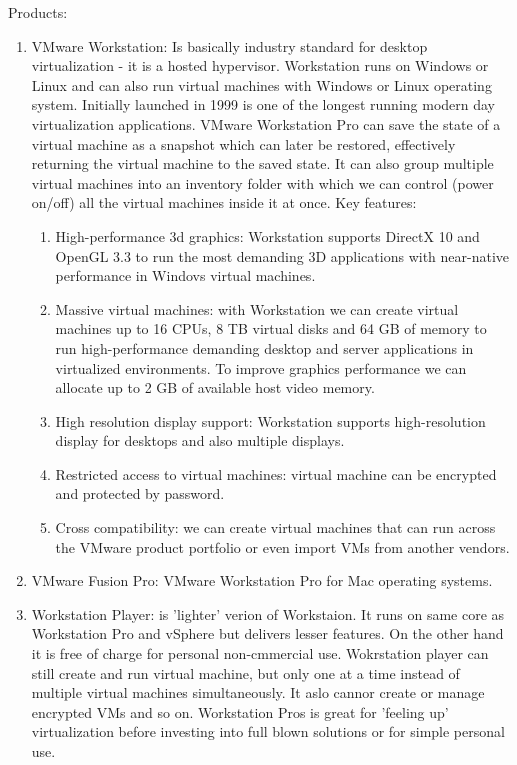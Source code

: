 \begin{itemize}
Products:
\begin{enumerate}
\item VMware Workstation: Is basically industry standard for desktop virtualization - it is a hosted hypervisor. Workstation runs on Windows or Linux and can also run virtual machines with Windows or Linux operating system. Initially launched in 1999 is one of the longest running modern day virtualization applications. VMware Workstation Pro can save the state of a virtual machine as a snapshot which can later be restored, effectively returning the virtual machine to the saved state. It can also group multiple virtual machines into an inventory folder with which we can control (power on/off) all the virtual machines inside it at once.
Key features:
\begin{enumerate}
\item High-performance 3d graphics: Workstation supports DirectX 10 and OpenGL 3.3 to run the most demanding 3D applications with near-native performance in Windovs virtual machines.
\item Massive virtual machines: with Workstation we can create virtual machines up to 16 CPUs, 8 TB virtual disks and 64 GB of memory to run high-performance demanding desktop and server applications in virtualized environments. To improve graphics performance we can allocate  up to 2 GB of available host video memory.
\item High resolution display support: Workstation supports high-resolution display for desktops and also multiple displays.
\item Restricted access to virtual machines: virtual machine can be encrypted and protected by password.
\item Cross compatibility: we can create virtual machines that can run across the VMware product portfolio or even import VMs from another vendors.
\end{enumerate}
\item VMware Fusion Pro: VMware Workstation Pro for Mac operating systems.
\item Workstation Player: is 'lighter' verion of Workstaion. It runs on same core as Workstation Pro and vSphere but delivers lesser features. On the other hand it is free of charge for personal non-cmmercial use. Wokrstation player can still create and run virtual machine, but only one at a time instead of multiple virtual machines simultaneously. It aslo cannor create or manage encrypted VMs and so on. Workstation Pros is great for 'feeling up' virtualization before investing into full blown solutions or for simple personal use.

\end{enumerate}
\end{itemize}
